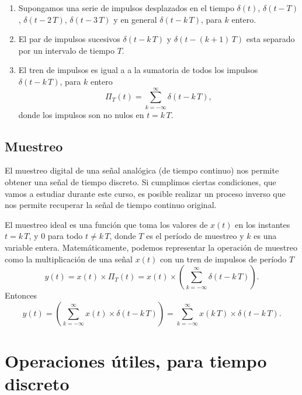 \begin{enumerate}
\item Supongamos una serie de impulsos desplazados en el tiempo $\delta(t)$,
$\delta(t - T)$, $\delta(t - 2 \, T)$, $\delta(t - 3 \, T)$ y en
general $\delta(t - k \, T)$, para $k$ entero. 

\item El par de impulsos sucesivos $\delta(t - k \, T)$ y $\delta(t -
  (k+1) \, T)$ esta separado por un intervalo de tiempo $T$.

\item El tren de impulsos es igual a a la sumatoria de todos los
  impulsos $\delta(t - k \, T)$, para $k$ entero
\begin{equation}
\Pi_{T}(t) = \sum_{k=-\infty}^{\infty} \delta(t - k \, T),
\end{equation}
donde los impulsos son no nulos en $t = k \, T$.
\end{enumerate}

\subsection{Muestreo}

El muestreo digital de una señal analógica (de tiempo continuo) nos permite obtener una señal de tiempo discreto.
Si cumplimos ciertas condiciones, que vamos a estudiar durante este curso, 
es posible realizar un proceso inverso que nos permite recuperar la señal de tiempo continuo original.

El muestreo ideal es una función que toma los valores de $x(t)$ en los instantes $t = k \, T$, y $0$ para todo $t \neq k \, T$, 
donde $T$ es el período de muestreo y $k$ es una variable entera. Matemáticamente, podemos representar la operación de muestreo como 
la multiplicación de una señal $x(t)$ con un tren de impulsos de período $T$
\begin{equation}
 y(t) = x(t) \times \Pi_{T}(t) = x(t) \times \left( 
 \sum_{k=-\infty}^{\infty} \delta(t - k \, T)
 \right).
\end{equation}
Entonces
\begin{equation}
	y(t) =  
	\left( 
	\sum_{k=-\infty}^{\infty} x(t) \times \delta(t - k \, T)
	\right) =
    \sum_{k=-\infty}^{\infty} x(k \, T) \times \delta(t - k \, T).
\end{equation}


\section{Operaciones útiles, para tiempo discreto}

